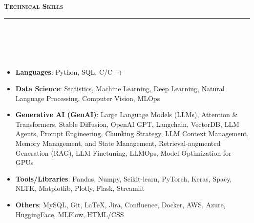 \documentclass[a4paper,10pt]{article}
\newcommand{\lsep}{-0.5cm}
\newcommand{\resheading}[1]{{\small
        {
            \begin{minipage}
                {0.992\textwidth}\textbf{{\textsc{#1 \vphantom{p\^{E}} }}}
                \\[-0.3cm]
                \hrule
            \end{minipage}
            \\[-0.5cm]
        }
 }}
\begin{document}

\vspace{2pt}
\noindent
\resheading{\textbf{\large Technical Skills}}\\[\lsep] 
\\[-0.3cm]
\begin{itemize}
  \item \textbf{Languages}: Python, SQL, C/C++\\[-0.6cm]
  \item \textbf{Data Science}: Statistics, Machine Learning, Deep Learning, Natural Language Processing, Computer Vision, MLOps  \\[-0.6cm]
  \item \textbf{Generative AI (GenAI)}: Large Language Models (LLMs), Attention \& Transformers, Stable Diffusion, OpenAI GPT, Langchain, VectorDB, LLM Agents, Prompt Engineering, Chunking Strategy, LLM Context Management, \\Memory Management, and State Management, Retrieval-augmented Generation (RAG), LLM Finetuning, LLMOps, Model Optimization for GPUs \\[-0.6cm]
  \item \textbf{Tools/Libraries}: Pandas, Numpy, Scikit-learn, PyTorch, Keras, Spacy, NLTK, Matplotlib, Plotly, Flask, Streamlit \\[-0.6cm]
  \item \textbf{Others}: MySQL, Git, LaTeX, Jira, Confluence, Docker, AWS, Azure, HuggingFace, MLFlow, HTML/CSS\\[-0.5cm]
\end{itemize}

\end{document}
